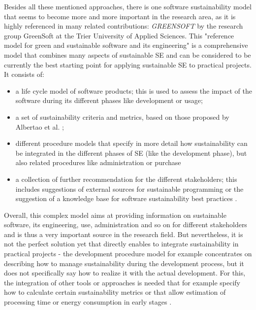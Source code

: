 \documentclass[oribibl]{llncs}
\begin{document}
Besides all these mentioned approaches, there is one software sustainability model that seems to become more and more important in the research area, as it is highly referenced in many related contributions: \textit{GREENSOFT} \cite{naumann_greensoft_2011} by the research group GreenSoft at the Trier University of Applied Sciences. This "reference model for green and sustainable software and its engineering" \cite{naumann_greensoft_2011} is a comprehensive model that combines many aspects of sustainable SE %
and can be considered to be currently the best starting point for applying sustainable SE to practical projects. It consists of:
\begin{itemize}
	\item a life cycle model of software products; this is used to assess the impact of the software during its different phases like development or usage; \cite{naumann_greensoft_2011}
	\item a set of sustainability criteria and metrics, based on those proposed by Albertao et al. \cite{albertao_measuring_2010}; \cite{naumann_greensoft_2011}
	\item different procedure models that specify in more detail how sustainability can be integrated in the different phases of SE (like the development phase), but also related procedures like administration or purchase \cite{naumann_greensoft_2011}
	\item a collection of further recommendation for the different stakeholders; this includes suggestions of external sources for sustainable programming or the suggestion of a knowledge base for software sustainability best practices \cite{naumann_greensoft_2011}.
\end{itemize} %
Overall, this complex model aims at providing information on sustainable software, its engineering, use, administration and so on for different stakeholders and is thus a very important source in the research field. But nevertheless, it is not the perfect solution yet that directly enables to integrate sustainability in practical projects - the development procedure model for example concentrates on describing how to manage sustainability %
during the development process, %
but it does not specifically say how to realize it with the actual development. For this, the integration of other tools or approaches is needed that for example specify how to calculate certain sustainability metrics or that allow estimation of processing time or energy consumption in early stages \cite{naumann_greensoft_2011} %
.
\end{document}
